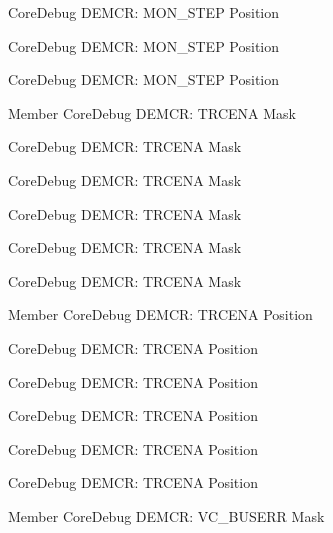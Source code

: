 \begin{DoxyRefList}
\label{deprecated__deprecated000049}%
%
Core\+Debug DEMCR\+: MON\+\_\+\+STEP Position 

\label{deprecated__deprecated000411}%
%
Core\+Debug DEMCR\+: MON\+\_\+\+STEP Position 

\label{deprecated__deprecated000500}%
%
Core\+Debug DEMCR\+: MON\+\_\+\+STEP Position  
\item[Member \doxylink{group__CMSIS__CoreDebug_ga5e99652c1df93b441257389f49407834}{Core\+Debug\+\_\+\+DEMCR\+\_\+\+TRCENA\+\_\+\+Msk} ]\label{deprecated__deprecated000408}%
%
Core\+Debug DEMCR\+: TRCENA Mask 

\label{deprecated__deprecated000599}%
%
Core\+Debug DEMCR\+: TRCENA Mask 

\label{deprecated__deprecated000497}%
%
Core\+Debug DEMCR\+: TRCENA Mask 

\label{deprecated__deprecated000332}%
%
Core\+Debug DEMCR\+: TRCENA Mask 

\label{deprecated__deprecated000046}%
%
Core\+Debug DEMCR\+: TRCENA Mask 

\label{deprecated__deprecated000190}%
%
Core\+Debug DEMCR\+: TRCENA Mask  
\item[Member \doxylink{group__CMSIS__CoreDebug_ga6ff2102b98f86540224819a1b767ba39}{Core\+Debug\+\_\+\+DEMCR\+\_\+\+TRCENA\+\_\+\+Pos} ]\label{deprecated__deprecated000045}%
%
Core\+Debug DEMCR\+: TRCENA Position 

\label{deprecated__deprecated000598}%
%
Core\+Debug DEMCR\+: TRCENA Position 

\label{deprecated__deprecated000189}%
%
Core\+Debug DEMCR\+: TRCENA Position 

\label{deprecated__deprecated000496}%
%
Core\+Debug DEMCR\+: TRCENA Position 

\label{deprecated__deprecated000331}%
%
Core\+Debug DEMCR\+: TRCENA Position 

\label{deprecated__deprecated000407}%
%
Core\+Debug DEMCR\+: TRCENA Position  
\item[Member \doxylink{group__CMSIS__CoreDebug_ga9d29546aefe3ca8662a7fe48dd4a5b2b}{Core\+Debug\+\_\+\+DEMCR\+\_\+\+VC\+\_\+\+BUSERR\+\_\+\+Msk} ]\label{deprecated__deprecated000511}%
%
Core\+Debug DEMCR\+: VC\+\_\+\+BUSERR Mask 


\end{DoxyRefList}
